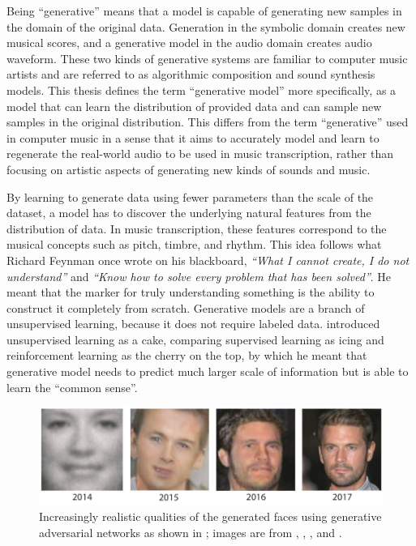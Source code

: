 Being ``generative'' means that a model is capable of generating new samples in the domain of the original data.
Generation in the symbolic domain creates new musical scores, and a generative model in the audio domain creates audio waveform.
These two kinds of generative systems are familiar to computer music artists and are referred to as algorithmic composition \cite{fernandez2013ai} and sound synthesis \cite{cook2002synthesis} models.
This thesis defines the term ``generative model'' more specifically, as a model that can learn the distribution of provided data and can sample new samples in the original distribution.
This differs from the term ``generative'' used in computer music in a sense that it aims to accurately model and learn to regenerate the real-world audio to be used in music transcription, rather than focusing on artistic aspects of generating new kinds of sounds and music.

By learning to generate data using fewer parameters than the scale of the dataset, a model has to discover the underlying natural features from the distribution of data.
In music transcription, these features correspond to the musical concepts such as pitch, timbre, and rhythm.
This idea follows what Richard Feynman once wrote on his blackboard, \emph{``What I cannot create, I do not understand''} and \emph{``Know how to solve every problem that has been solved''}.
He meant that the marker for truly understanding something is the ability to construct it completely from scratch.
Generative models are a branch of unsupervised learning, because it does not require labeled data.
 introduced unsupervised learning as a cake, comparing supervised learning as icing and reinforcement learning as the cherry on the top, by which he meant that generative model needs to predict much larger scale of information but is able to learn the ``common sense''.

\begin{figure}
	\includegraphics[width=\textwidth]{generative-evolution.pdf}
	\caption{Increasingly realistic qualities of the generated faces using generative adversarial networks as shown in \protect\cite{brundage2018malicious}; images are from \protect\cite{goodfellow2014gan}, \protect\cite{radford2015dcgan}, \protect\cite{liu2016cogan}, and \protect\cite{karras2017pggan}.}
	\label{fig:generative-evolution}
\end{figure}


